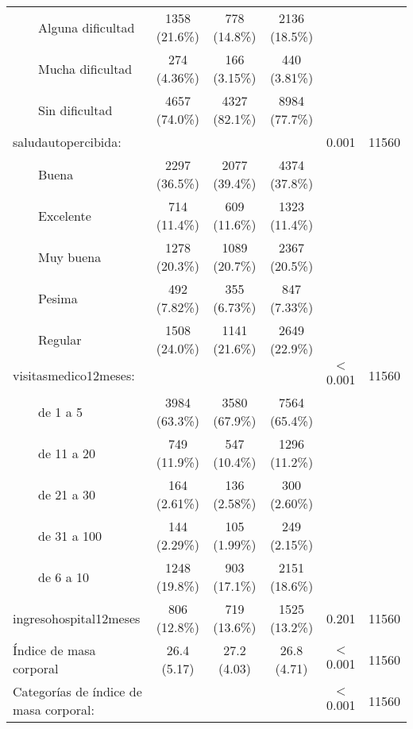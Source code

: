\documentclass[a4paper,12pt, titlepage]{article}\usepackage[]{graphicx}\usepackage[]{color}
\begin{document}
\begin{landscape}
\begin{small}
\begin{longtable}{lccccc}
$\qquad$Alguna dificultad &    1358 (21.6\%)     &     778 (14.8\%)     &    2136 (18.5\%)     &           &      \\ 
$\qquad$Mucha dificultad &     274 (4.36\%)     &     166 (3.15\%)     &     440 (3.81\%)     &           &      \\ 
$\qquad$Sin dificultad &    4657 (74.0\%)     &    4327 (82.1\%)     &    8984 (77.7\%)     &           &      \\ 
saludautopercibida: &                     &                     &                     &   0.001   & 11560\\ 
$\qquad$Buena &    2297 (36.5\%)     &    2077 (39.4\%)     &    4374 (37.8\%)     &           &      \\ 
$\qquad$Excelente &     714 (11.4\%)     &     609 (11.6\%)     &    1323 (11.4\%)     &           &      \\ 
$\qquad$Muy buena &    1278 (20.3\%)     &    1089 (20.7\%)     &    2367 (20.5\%)     &           &      \\ 
$\qquad$Pesima &     492 (7.82\%)     &     355 (6.73\%)     &     847 (7.33\%)     &           &      \\ 
$\qquad$Regular &    1508 (24.0\%)     &    1141 (21.6\%)     &    2649 (22.9\%)     &           &      \\ 
visitasmedico12meses: &                     &                     &                     &  $<$0.001   & 11560\\ 
$\qquad$de 1 a 5 &    3984 (63.3\%)     &    3580 (67.9\%)     &    7564 (65.4\%)     &           &      \\ 
$\qquad$de 11 a 20 &     749 (11.9\%)     &     547 (10.4\%)     &    1296 (11.2\%)     &           &      \\ 
$\qquad$de 21 a 30 &     164 (2.61\%)     &     136 (2.58\%)     &     300 (2.60\%)     &           &      \\ 
$\qquad$de 31 a 100 &     144 (2.29\%)     &     105 (1.99\%)     &     249 (2.15\%)     &           &      \\ 
$\qquad$de 6 a 10 &    1248 (19.8\%)     &     903 (17.1\%)     &    2151 (18.6\%)     &           &      \\ 
ingresohospital12meses &     806 (12.8\%)     &     719 (13.6\%)     &    1525 (13.2\%)     &   0.201   & 11560\\ 
Índice de masa corporal &     26.4 (5.17)     &     27.2 (4.03)     &     26.8 (4.71)     &  $<$0.001   & 11560\\ 
Categorías de índice de masa corporal: &                     &                     &                     &  $<$0.001   & 11560\\ 

\end{longtable}
\end{small}
\end{landscape}
\end{document}
